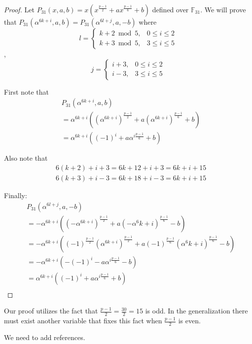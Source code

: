 \documentclass[12pt]{article}
\begin{document}
\begin{proof}
	Let $P_{31}(x,a,b) = x(x^{\frac{p-1}{2}}+ax^{\frac{p-1}{6}}+b)$ defined over $\mathbb{F}_{31}$. We will prove that $P_{31}(\alpha^{6k+i},a,b) = P_{31}(\alpha^{6l+j},a,-b)$ where
	$$
	l =
	\begin{cases}
	k+2 \bmod{5}, & 0 \leq i \leq 2 \\
	k+3 \bmod{5}, & 3 \leq i \leq 5
	\end{cases}
	$$
	,
	$$
	j =
	\begin{cases}
	i+3, & 0 \leq i \leq 2 \\
	i-3, & 3 \leq i \leq 5
	\end{cases}
	$$
	
	First note that
	\begin{align*}
	&P_{31}(\alpha^{6k+i},a,b) \\
	&=\alpha^{6k+i}((\alpha^{6k+i})^{\frac{p-1}{2}}+a(\alpha^{6k+i})^{\frac{p-1}{6}}+b) \\
	&=\alpha^{6k+i}((-1)^{i}+a\alpha^{i\frac{p-1}{6}}+b)
	\end{align*}

	Also note that
	\begin{align*}
	&6(k+2)+i+3=6k+12+i+3=6k+i+15 \\
	&6(k+3)+i-3=6k+18+i-3=6k+i+15
	\end{align*}

	Finally:
	\begin{align*}
	&P_{31}(\alpha^{6l+j},a,-b)	\\
	&= -\alpha^{6k+i}((-\alpha^{6k+i})^\frac{p-1}{2}+a(-\alpha^6k+i)^\frac{p-1}{6}-b) \\
	&= -\alpha^{6k+i}((-1)^{\frac{p-1}{2}}(\alpha^{6k+i})^\frac{p-1}{2}+a(-1)^{\frac{p-1}{6}}(\alpha^6k+i)^\frac{p-1}{6}-b) \\
	&= -\alpha^{6k+i}(-(-1)^{i}-a\alpha^{i\frac{p-1}{6}}-b) \\
	&= \alpha^{6k+i}((-1)^{i}+a\alpha^{i\frac{p-1}{6}}+b) \\
	\end{align*}
	
\end{proof}

Our proof utilizes the fact that $\frac{p-1}{2} = \frac{30}{2}=15$ is odd. In the generalization there must exist another variable that fixes this fact when $\frac{p-1}{2}$ is even.


\begin{thebibliography}{}

We need to add references.

\end{thebibliography}
\end{document}
